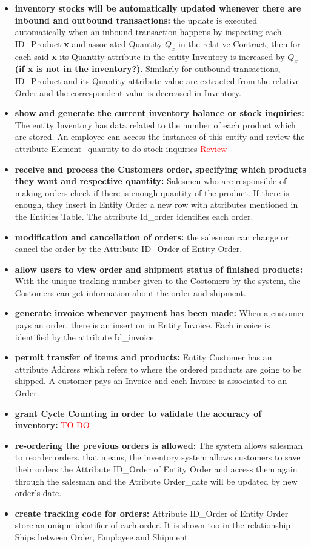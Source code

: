 \begin{itemize}
\item \textbf{inventory stocks will be automatically updated whenever there are inbound and outbound transactions:} the update is executed automatically when an inbound transaction happens by inspecting each ID\_Product \textbf{x} and associated Quantity \(Q_x\) in the relative Contract, then for each said \textbf{x} its Quantity attribute in the entity Inventory is increased by  \(Q_x\) \textbf{(if x is not in the inventory?)}. Similarly for outbound transactions, ID\_Product and its Quantity attribute value are extracted from the relative Order and the correspondent value is decreased in Inventory.
    \item \textbf{show and generate the current inventory balance or stock inquiries:} The entity Inventory has data related to the number of each product which are stored. An employee can access the instances of this entity and review the attribute Element\_quantity to do stock inquiries \textcolor{Red}{Review} 
    \item \textbf{receive and process the Customers order, specifying which products they want and respective quantity:} Salesmen who are responsible of making orders check if there is enough quantity of the product. If there is enough, they insert in Entity Order a new row with attributes mentioned in the Entities Table. The attribute Id\_order identifies each order.
    \item \textbf{modification and cancellation of orders:} the salesman can change or cancel the order by the Attribute ID\_Order of Entity Order.
    \item \textbf{allow users to view order and shipment status of finished products:} With the unique tracking number given to the Costomers by the system, the Costomers can get information about the order and shipment.
    \item \textbf{generate invoice whenever payment has been made:} When a customer pays an order, there is an insertion in  Entity Invoice. Each invoice is identified by the attribute Id\_invoice.
    \item \textbf{permit transfer of items and products:} Entity Customer has an attribute Address which refers to where the ordered products are going to be shipped. A customer pays an Invoice and each Invoice is associated to an Order.
    \item \textbf{grant Cycle Counting in order to validate the accuracy of inventory:} \textcolor{Red}{TO DO}
    \item \textbf{re-ordering the previous orders is allowed:} The system allows salesman to reorder orders. that means, the inventory system allows customers to save their orders the Attribute ID\_Order of Entity Order and access them again through the salesman and the Atribute Order\_date will be updated by new order's date.
    \item \textbf{create tracking code for orders:} Attribute ID\_Order of Entity Order store an unique identifier of each order. It is shown too in the relationship Ships between Order, Employee and Shipment.
\end{itemize}




